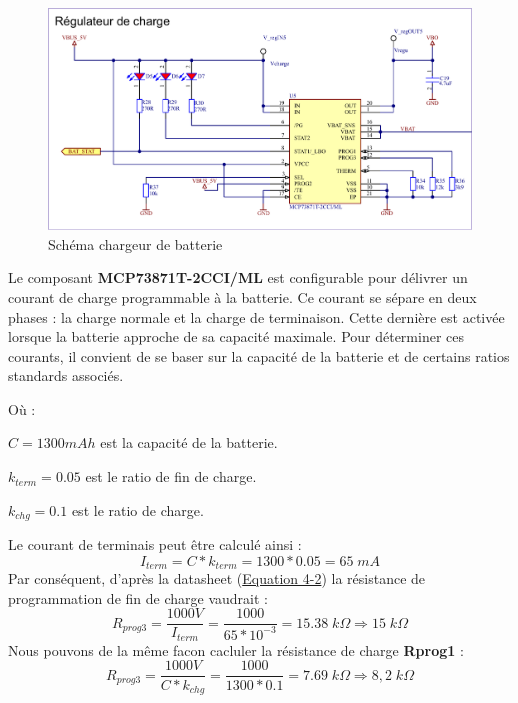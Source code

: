 \begin{figure}[h]
	\centering
	\includegraphics[width=.93\linewidth]{../figures/etude/sch/CHRG-BAT}
	\caption{Schéma chargeur de batterie}
	\label{fig:chrg-bat}
\end{figure}

Le composant \textbf{MCP73871T-2CCI/ML} est configurable pour délivrer un courant de charge programmable à la batterie. Ce courant se sépare en deux phases : la charge normale et la charge de terminaison. Cette dernière est activée lorsque la batterie approche de sa capacité maximale. Pour déterminer ces courants, il convient de se baser sur la capacité de la batterie et de certains ratios standards associés.

Où :

$C = 1300 mAh$ est la capacité de la batterie.

$k_{term} = 0.05$ est le ratio de fin de charge.

$k_{chg} = 0.1$ est le ratio de charge.

Le courant de terminais peut être calculé ainsi :
\begin{equation*}
	I_{term} = C * k_{term} = 1300 * 0.05 = 65 \; mA
\end{equation*}
Par conséquent, d'après la \gls{datasheet} (\href{https://ww1.microchip.com/downloads/en/DeviceDoc/MCP73871-Data-Sheet-20002090E.pdf}{Equation 4-2}) la résistance de programmation de fin de charge vaudrait :
\begin{equation*}
	R_{prog3} = \frac{1000V}{I_{term}} = \frac{1000}{65*10^{-3}} = 15.38 \; k\Omega \Rightarrow 15 \; k\Omega
\end{equation*}
Nous pouvons de la même facon cacluler la résistance de charge \textbf{Rprog1} :
\begin{equation*}
	R_{prog3} = \frac{1000V}{C*k_{chg}} = \frac{1000}{1300*0.1} = 7.69 \; k\Omega \Rightarrow 8,2 \; k\Omega
\end{equation*}

